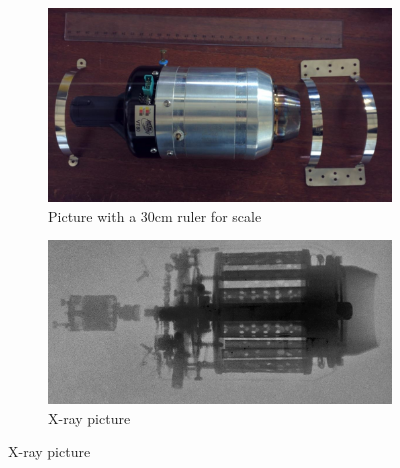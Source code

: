 \documentclass[tcc]{subfiles}
\begin{document}
\begin{figure}[p]
    \centering
    \caption{JetsMunt VT-80 jet engine}
    \label{fig:engine}
    \begin{subfigure}{\textwidth}
        \includegraphics[width=\textwidth]{fig/JetsMuntVT-80.jpg}
        \caption{Picture with a 30cm ruler for scale}
        \label{fig:engine!visible}
    \end{subfigure}
    \begin{subfigure}{\textwidth}
        \includegraphics[width=\textwidth]{fig/JetsMuntVT-80X-ray_enhanced.jpg}
        \caption{X-ray picture}
        \label{fig:engine!x-ray}
    \end{subfigure}
\end{figure}
\end{document}
